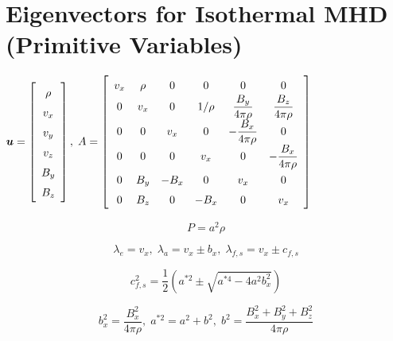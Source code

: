 \newpage

\section{Eigenvectors for Isothermal MHD (Primitive Variables)}

\begin{center}
$\renewcommand{\arraystretch}{1.5}
\mbox{\boldmath $u$} =
\left[
\begin{array}{c}
\rho \\
v_{x} \\
v_{y} \\
v_{z} \\
B_{y} \\
B_{z} \\
\end{array}
\right], \;
\renewcommand{\arraystretch}{1.5}
A =
\left[
\begin{array}{ccccccc}
v_x & \rho & 0 & 0 & 0 & 0 \\
0 & v_x & 0 & 1/\rho & \displaystyle \frac{B_y}{4\pi\rho} & 
\displaystyle \frac{B_z}{4\pi\rho} \\
0 & 0 & v_x & 0 & \displaystyle - \frac{B_x}{4\pi\rho} & 0 \\
0 & 0 & 0 & v_x & 0 & \displaystyle - \frac{B_x}{4\pi\rho} \\
0 & B_y & -B_x & 0 & v_x & 0 \\
0 & B_z & 0 & -B_x & 0 & v_x  \\
\end{array}
\right]$\end{center}


\begin{equation}
P = a^2 \rho
\end{equation}

\begin{equation}
\lambda_{e} = {v}_{x}, \; 
\lambda_{a} = {v}_{x} \pm b_{x} , \; 
\lambda_{f,s} = {v}_{x} \pm c_{f,s}
\end{equation}

\begin{equation}
c_{f,s}^2 = \frac12 \left( a^{\ast 2} \pm \sqrt{a^{\ast 4} 
- 4 a^2 b_x^2}\right)
\end{equation}

\begin{equation}
b_{x}^2 = \frac{B_{x}^2}{4 \pi {\rho}}, \;
a^{\ast 2} = a^2 + b^{2}, \;
b^2 = \frac{B_{x}^2 + B_{y}^2 + B_{z}^2}{4 \pi {\rho}}
\end{equation}

